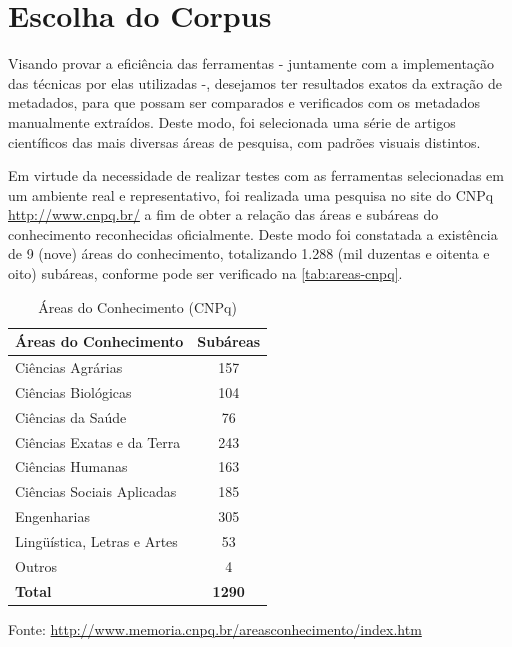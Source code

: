 \section{Escolha do Corpus}
\label{sec:corpus}


Visando provar a eficiência das ferramentas - juntamente com a implementação das técnicas por elas utilizadas -, desejamos ter resultados exatos da extração de metadados, para que possam ser comparados e verificados com os metadados manualmente extraídos. Deste modo, foi selecionada uma série de artigos científicos das mais diversas áreas de pesquisa, com padrões visuais distintos.


Em virtude da necessidade de realizar testes com as ferramentas selecionadas em um ambiente real e representativo, foi realizada uma pesquisa no site do CNPq \url{http://www.cnpq.br/} a fim de obter a relação das áreas e subáreas do conhecimento reconhecidas oficialmente. Deste modo foi constatada a existência de 9 (nove) áreas do conhecimento, totalizando 1.288 (mil duzentas e oitenta e oito) subáreas, conforme pode ser verificado na \autoref{tab:areas-cnpq}.

\begin{table}
    \caption{Áreas do Conhecimento (CNPq)}
    \begin{center}
        \begin{tabular}{|l|c|}
            \hline 
            \textbf{Áreas do Conhecimento} & \textbf{Subáreas} \\ 
            \hline 
            Ciências Agrárias & 157 \\
            Ciências Biológicas & 104 \\
            Ciências da Saúde & 76 \\
            Ciências Exatas e da Terra & 243 \\
            Ciências Humanas & 163 \\
            Ciências Sociais Aplicadas & 185 \\
            Engenharias & 305 \\
            Lingüística, Letras e Artes & 53 \\
            Outros & 4 \\
            \hline
            \textbf{Total} & \textbf{1290} \\
            \hline
        \end{tabular}
    \end{center}
    \center\footnotesize{Fonte: \url{http://www.memoria.cnpq.br/areasconhecimento/index.htm}}
    \label{tab:areas-cnpq}
\end{table}

